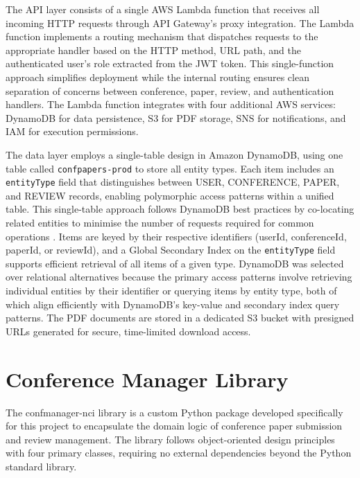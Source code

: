 \documentclass[conference]{IEEEtran}
\begin{document}
The API layer consists of a single AWS Lambda function that receives all incoming HTTP requests through API Gateway's proxy integration. The Lambda function implements a routing mechanism that dispatches requests to the appropriate handler based on the HTTP method, URL path, and the authenticated user's role extracted from the JWT token. This single-function approach simplifies deployment while the internal routing ensures clean separation of concerns between conference, paper, review, and authentication handlers. The Lambda function integrates with four additional AWS services: DynamoDB for data persistence, S3 for PDF storage, SNS for notifications, and IAM for execution permissions.

The data layer employs a single-table design in Amazon DynamoDB, using one table called \texttt{confpapers-prod} to store all entity types. Each item includes an \texttt{entityType} field that distinguishes between USER, CONFERENCE, PAPER, and REVIEW records, enabling polymorphic access patterns within a unified table. This single-table approach follows DynamoDB best practices by co-locating related entities to minimise the number of requests required for common operations \cite{awsdynamodb}. Items are keyed by their respective identifiers (userId, conferenceId, paperId, or reviewId), and a Global Secondary Index on the \texttt{entityType} field supports efficient retrieval of all items of a given type. DynamoDB was selected over relational alternatives because the primary access patterns involve retrieving individual entities by their identifier or querying items by entity type, both of which align efficiently with DynamoDB's key-value and secondary index query patterns. The PDF documents are stored in a dedicated S3 bucket with presigned URLs generated for secure, time-limited download access.

\section{Conference Manager Library}

The confmanager-nci library is a custom Python package developed specifically for this project to encapsulate the domain logic of conference paper submission and review management. The library follows object-oriented design principles with four primary classes, requiring no external dependencies beyond the Python standard library.
\end{document}
